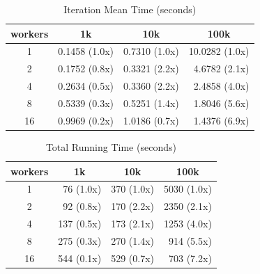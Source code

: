 \documentclass[%
  final,
  notitlepage,
  narroweqnarray,
  inline,
]{ieee}
\begin{document}
\begin{table}[htbp]
  \small
  \begin{center}
    \begin{tabular}{crrr}
    workers  & \multicolumn{1}{c}{1k} & \multicolumn{1}{c}{10k}
             & \multicolumn{1}{c}{100k} \\
      \hline
    1  & 0.1458 (1.0x) & 0.7310 (1.0x) & 10.0282 (1.0x) \\
    2  & 0.1752 (0.8x) & 0.3321 (2.2x) & 4.6782  (2.1x) \\
    4  & 0.2634 (0.5x) & 0.3360 (2.2x) & 2.4858  (4.0x) \\
    8  & 0.5339 (0.3x) & 0.5251 (1.4x) & 1.8046  (5.6x) \\
    16 & 0.9969 (0.2x) & 1.0186 (0.7x) & 1.4376  (6.9x) \\
    \end{tabular}
  \end{center}
  \caption{Iteration Mean Time (seconds)}
  \label{table_iteration_timea}
\end{table}
\begin{table}[htbp]
  \small
  \begin{center}
    \begin{tabular}{crrr}
    workers  & \multicolumn{1}{c}{1k} & \multicolumn{1}{c}{10k}
             & \multicolumn{1}{c}{100k} \\
      \hline
    1  &  76  (1.0x) & 370 (1.0x) & 5030 (1.0x) \\
    2  &  92  (0.8x) & 170 (2.2x) & 2350 (2.1x) \\
    4  & 137  (0.5x) & 173 (2.1x) & 1253 (4.0x) \\
    8  & 275  (0.3x) & 270 (1.4x) & 914  (5.5x) \\
    16 & 544  (0.1x) & 529 (0.7x) & 703  (7.2x) \\
    \end{tabular}
  \end{center}
  \caption{Total Running Time (seconds)}
  \label{table_total_time}
\end{table}
\end{document}
